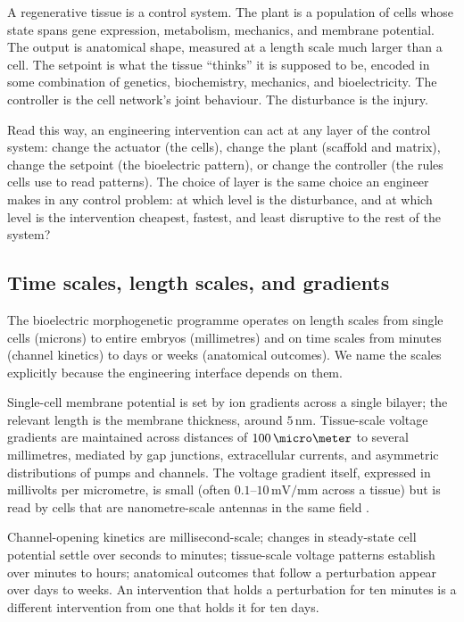 \begin{archetype}
A regenerative tissue is a control system. The plant is a population of
cells whose state spans gene expression, metabolism, mechanics, and
membrane potential. The output is anatomical shape, measured at a
length scale much larger than a cell. The setpoint is what the tissue
``thinks'' it is supposed to be, encoded in some combination of
genetics, biochemistry, mechanics, and bioelectricity. The controller
is the cell network's joint behaviour. The disturbance is the injury.

Read this way, an engineering intervention can act at any layer of the
control system: change the actuator (the cells), change the plant
(scaffold and matrix), change the setpoint (the bioelectric pattern),
or change the controller (the rules cells use to read patterns). The
choice of layer is the same choice an engineer makes in any control
problem: at which level is the disturbance, and at which level is the
intervention cheapest, fastest, and least disruptive to the rest of
the system?
\end{archetype}

\subsection{Time scales, length scales, and gradients}

The bioelectric morphogenetic programme operates on length scales from
single cells (microns) to entire embryos (millimetres) and on time
scales from minutes (channel kinetics) to days or weeks (anatomical
outcomes). We name the scales explicitly because the engineering
interface depends on them.

 Single-cell membrane potential is set by ion
gradients across a single bilayer; the relevant length is the membrane
thickness, around $5\,\text{nm}$. Tissue-scale voltage gradients are
maintained across distances of $100\,\micro\meter$ to several
millimetres, mediated by gap junctions, extracellular currents, and
asymmetric distributions of pumps and channels. The voltage gradient
itself, expressed in millivolts per micrometre, is small (often
$0.1$--$10\,\text{mV}/\text{mm}$ across a tissue) but is read by cells
that are nanometre-scale antennas in the same field
\cite{paper:v6c13-levin-bioelectric-2014}.

 Channel-opening kinetics are millisecond-scale;
changes in steady-state cell potential settle over seconds to minutes;
tissue-scale voltage patterns establish over minutes to hours;
anatomical outcomes that follow a perturbation appear over days to
weeks. An intervention that holds a perturbation for ten minutes is a
different intervention from one that holds it for ten days.

